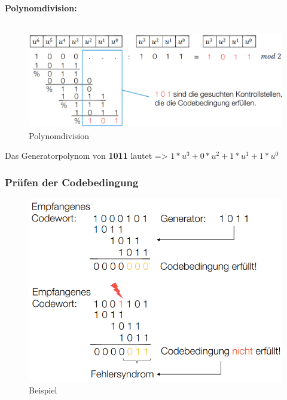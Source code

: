 \textbf{Polynomdivision:}\\
\\
\begin{figure}[h!]
	\centering
	\begin{minipage}[t]{0.6\textwidth}
		\centering
		\includegraphics[width=0.9\linewidth]{images/polynomdivision}
		\caption{Polynomdivision}
		\label{fig:polynomdivision}
	\end{minipage}
\end{figure}

Das Generatorpolynom von \textbf{1011} lautet => $1*u^3+0*u^2+1*u^1+1*u^0$

\subsubsection{Prüfen der Codebedingung}
\begin{figure}[h!]
	\centering
	\begin{minipage}[t]{0.6\textwidth}
		\centering
		\includegraphics[width=0.9\linewidth]{images/wortpruefen}
		\caption{Beispiel}
		\label{fig:wortpruefen}
	\end{minipage}
\end{figure}

